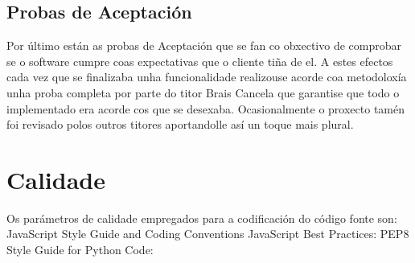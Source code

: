 \section{Probas de Aceptación}
    Por último están as probas de Aceptación que se fan co obxectivo de comprobar se o software cumpre
    coas expectativas que o cliente tiña de el. A estes efectos cada vez que se finalizaba unha 
    funcionalidade realizouse acorde coa metodoloxía unha proba completa por parte do titor Brais 
    Cancela que garantise que todo o implementado era acorde cos que se desexaba. Ocasionalmente o 
    proxecto tamén foi revisado polos outros titores aportandolle así un toque mais plural.
    

\chapter{Calidade}
	Os parámetros de calidade empregados para a codificación do código fonte son:
		JavaScript Style Guide and Coding Conventions\cite{javascript-style-guide}
		JavaScript Best Practices:\cite{javascript-best-practices}
		PEP8 Style Guide for Python Code: \cite{pepe8-style-guide}